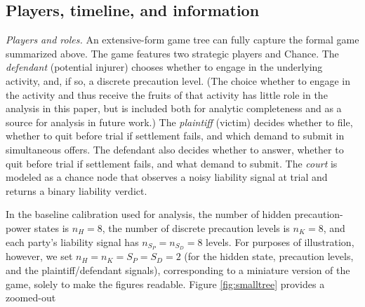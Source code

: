 \documentclass{article}
\begin{document}
\subsection{Players, timeline, and information}
\emph{Players and roles.} An extensive-form game tree can fully capture the formal game summarized above. The game features two strategic players and Chance. The \emph{defendant} (potential injurer) chooses whether to engage in the underlying activity, and, if so, a discrete precaution level. (The choice whether to engage in the activity and thus receive the fruits of that activity has little role in the analysis in this paper, but is included both for analytic completeness and as a source for analysis in future work.) The \emph{plaintiff} (victim) decides whether to file, whether to quit before trial if settlement fails, and which demand to submit in simultaneous offers. The defendant also decides whether to answer, whether to quit before trial if settlement fails, and what demand to submit. The \emph{court} is modeled as a chance node that observes a noisy liability signal at trial and returns a binary liability verdict.

In the baseline calibration used for analysis, the number of hidden precaution-power states is $n_H=8$, the number of discrete precaution levels is $n_K=8$, and each party’s liability signal has $n_{S_P}=n_{S_D}=8$ levels. For purposes of illustration, however, we set $n_H = n_K = S_P = S_D = 2$ (for the hidden state, precaution levels, and the plaintiff/defendant signals), corresponding to a miniature version of the game, solely to make the figures readable. Figure \ref{fig:smalltree} provides a zoomed-out 
\end{document}
